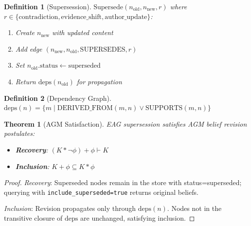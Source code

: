 \documentclass[11pt,letterpaper]{article}
\newtheorem{definition}{Definition}[section]
\newtheorem{theorem}{Theorem}[section]
\begin{document}
\begin{definition}[Supersession]
\label{def:supersession}
$\text{Supersede}(n_{\text{old}}, n_{\text{new}}, r)$ where $r \in \{\text{contradiction}, \text{evidence\_shift}, \text{author\_update}\}$:
\begin{enumerate}[noitemsep]
    \item Create $n_{\text{new}}$ with updated content
    \item Add edge $(n_{\text{new}}, n_{\text{old}}, \text{SUPERSEDES}, r)$
    \item Set $n_{\text{old}}.\text{status} \gets \text{superseded}$
    \item Return $\text{deps}(n_{\text{old}})$ for propagation
\end{enumerate}
\end{definition}

\begin{definition}[Dependency Graph]
\label{def:deps}
$\text{deps}(n) = \{m \mid \text{DERIVED\_FROM}(m, n) \vee \text{SUPPORTS}(m, n)\}$
\end{definition}

\begin{theorem}[AGM Satisfaction]
\label{thm:agm}
EAG supersession satisfies AGM belief revision postulates:
\begin{itemize}[noitemsep]
    \item \textbf{Recovery}: $(K * \neg\phi) + \phi \vdash K$
    \item \textbf{Inclusion}: $K + \phi \subseteq K * \phi$
\end{itemize}
\end{theorem}

\begin{proof}
\textit{Recovery}: Superseded nodes remain in the store with status=superseded; querying with \texttt{include\_superseded=true} returns original beliefs.

\textit{Inclusion}: Revision propagates only through $\text{deps}(n)$. Nodes not in the transitive closure of $\text{deps}$ are unchanged, satisfying inclusion.
\end{proof}
\end{document}
